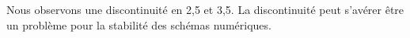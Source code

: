 Nous observons une discontinuité en 2,5 et 3,5. La discontinuité peut s'avérer être un problème pour la stabilité des schémas numériques.

